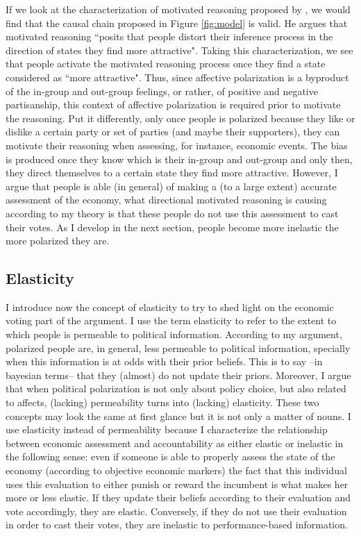 \documentclass[a4paper, svgnames]{article}
\begin{document}
If we look at the characterization of motivated reasoning proposed by \cite{Thaler2021}, we would find that the causal chain proposed in Figure \ref{fig:model} is valid. He argues that motivated reasoning ``posits that people distort their inference process in the direction of states they find more attractive". Taking this characterization, we see that people activate the motivated reasoning process once they find a state considered as ``more attractive". Thus, since affective polarization is a byproduct of the in-group and out-group feelings, or rather, of positive and negative partisanship, this context of affective polarization is required prior to motivate the reasoning. Put it differently, only once people is polarized because they like or dislike a certain party or set of parties (and maybe their supporters), they can motivate their reasoning when assessing, for instance, economic events. The bias is produced once they know which is their in-group and out-group and only then, they direct themselves to a certain state they find more attractive. However, I argue that people is able (in general) of making a (to a large extent) accurate assessment of the economy, what directional motivated reasoning is causing according to my theory is that these people do not use this assessment to cast their votes. As I develop in the next section, people become more inelastic the more polarized they are.

\subsection{Elasticity}

I introduce now the concept of elasticity to try to shed light on the economic voting part of the argument. I use the term elasticity to refer to the extent to which people is permeable to political information. According to my argument, polarized people are, in general, less permeable to political information, specially when this information is at odds with their prior beliefs. This is to say --in bayesian terms-- that they (almost) do not update their priors. Moreover, I argue that when political polarization is not only about policy choice, but also related to affects, (lacking) permeability turns into (lacking) elasticity. These two concepts may look the same at first glance but it is not only a matter of nouns. I use elasticity instead of permeability because I characterize the relationship between economic assessment and accountability as either elastic or inelastic in the following sense: even if someone is able to properly assess the state of the economy (according to objective economic markers) the fact that this individual uses this evaluation to either punish or reward the incumbent is what makes her more or less elastic. If they update their beliefs according to their evaluation and vote accordingly, they are elastic. Conversely, if they do not use their evaluation in order to cast their votes, they are inelastic to performance-based information.
\end{document}
